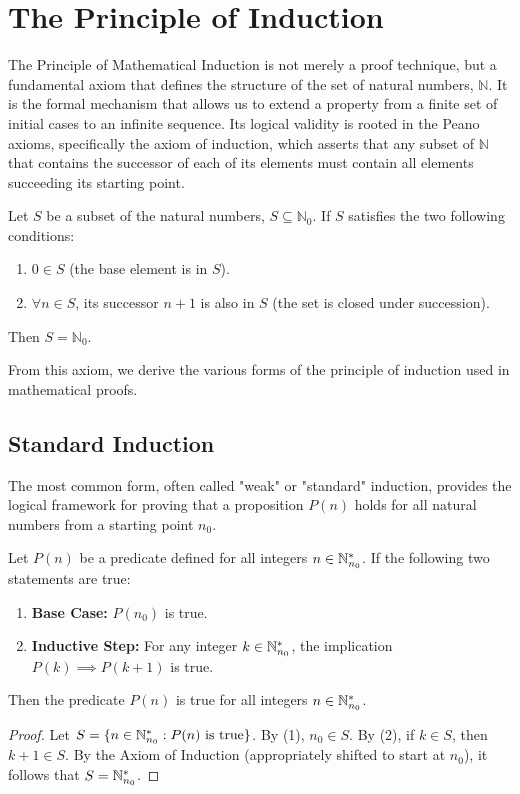 \section{The Principle of Induction}

The Principle of Mathematical Induction is not merely a proof technique, but a fundamental axiom that defines the structure of the set of natural numbers, $\mathbb{N}$. It is the formal mechanism that allows us to extend a property from a finite set of initial cases to an infinite sequence. Its logical validity is rooted in the Peano axioms, specifically the axiom of induction, which asserts that any subset of $\mathbb{N}$ that contains the successor of each of its elements must contain all elements succeeding its starting point.

\begin{theorem}
Let $S$ be a subset of the natural numbers, $S \subseteq \mathbb{N}_0$. If $S$ satisfies the two following conditions:
\begin{enumerate}
    \item $0 \in S$ (the base element is in $S$).
    \item $\forall n \in S$, its successor $n+1$ is also in $S$ (the set is closed under succession).
\end{enumerate}
Then $S = \mathbb{N}_0$.
\end{theorem}

From this axiom, we derive the various forms of the principle of induction used in mathematical proofs.

\subsection{Standard Induction}

The most common form, often called "weak" or "standard" induction, provides the logical framework for proving that a proposition $P(n)$ holds for all natural numbers from a starting point $n_0$.

\begin{theorem}\label{thm:standard_induction}
Let $P(n)$ be a predicate defined for all integers $n \in \mathbb{N}_{n_0}^*$. If the following two statements are true:
\begin{enumerate}
    \item \textbf{Base Case:} $P(n_0)$ is true.
    \item \textbf{Inductive Step:} For any integer $k \in \mathbb{N}_{n_0}^*$, the implication $P(k) \implies P(k+1)$ is true.
\end{enumerate}
Then the predicate $P(n)$ is true for all integers $n \in \mathbb{N}_{n_0}^*$.
\end{theorem}
\begin{proof}
Let $S = \{ n \in \mathbb{N}_{n_0}^* : P(n) \text{ is true} \}$. By (1), $n_0 \in S$. By (2), if $k \in S$, then $k+1 \in S$. By the Axiom of Induction (appropriately shifted to start at $n_0$), it follows that $S = \mathbb{N}_{n_0}^*$.
\end{proof}

